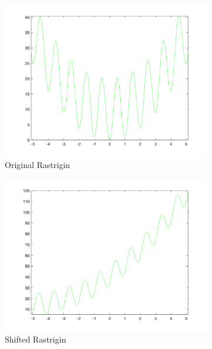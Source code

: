 \begin{figure}
  \centering
  \begin{subfigure}[b]{0.6\textwidth}
    \includegraphics[width=\textwidth]{img/translates/rastrigin/loa-graph-orig}
    \caption{Original Rastrigin}
  \end{subfigure}
  \begin{subfigure}[b]{0.6\textwidth}
    \includegraphics[width=\textwidth]{img/translates/rastrigin/loa-graph-shift}
    \caption{Shifted Rastrigin}
  \end{subfigure}
  \begin{subfigure}[b]{0.6\textwidth}

\end{subfigure}
\end{figure}
